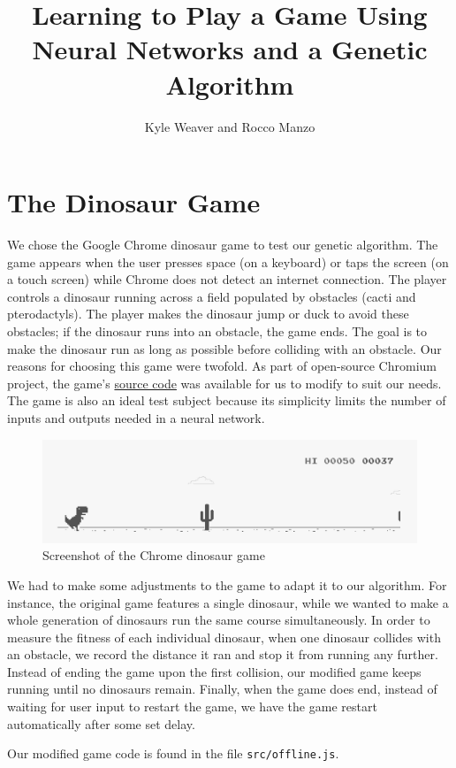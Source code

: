 \documentclass[11pt, oneside]{article}   	%
\title{Learning to Play a Game Using Neural Networks and a Genetic Algorithm}
\author{Kyle Weaver and Rocco Manzo}
\begin{document}
\maketitle

\begin{abstract}
\end{abstract}

\section{The Dinosaur Game}
We chose the Google Chrome dinosaur game to test our genetic algorithm. The game appears when the user presses space (on a keyboard) or taps the screen (on a touch screen) while Chrome does not detect an internet connection. The player controls a dinosaur running across a field populated by obstacles (cacti and pterodactyls). The player makes the dinosaur jump or duck to avoid these obstacles; if the dinosaur runs into an obstacle, the game ends. The goal is to make the dinosaur run as long as possible before colliding with an obstacle. Our reasons for choosing this game were twofold. As part of open-source Chromium project, the game's \href{https://github.com/chromium/chromium/tree/master/components/neterror/resources}{source code} was available for us to modify to suit our needs. The game is also an ideal test subject because its simplicity limits the number of inputs and outputs needed in a neural network.
\begin{figure}[h]
\caption{Screenshot of the Chrome dinosaur game}
\includegraphics[width=\textwidth]{dino}
\end{figure}

We had to make some adjustments to the game to adapt it to our algorithm. For instance, the original game features a single dinosaur, while we wanted to make a whole generation of dinosaurs run the same course simultaneously. In order to measure the fitness of each individual dinosaur, when one dinosaur collides with an obstacle, we record the distance it ran and stop it from running any further. Instead of ending the game upon the first collision, our modified game keeps running until no dinosaurs remain. Finally, when the game does end, instead of waiting for user input to restart the game, we have the game restart automatically after some set delay.

Our modified game code is found in the file \verb|src/offline.js|.
\end{document}
